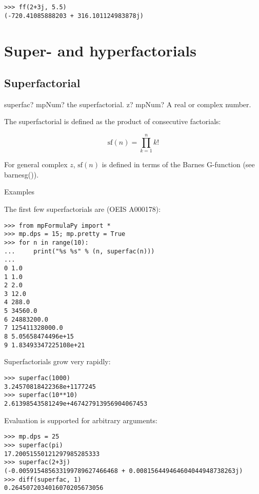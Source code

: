 \begin{lstlisting}
>>> ff(2+3j, 5.5)
(-720.41085888203 + 316.101124983878j)
\end{lstlisting}




\newpage
\section{Super- and hyperfactorials}
\subsection{Superfactorial}

\begin{mpFunctionsExtract}
	\mpFunctionOne
	{superfac? mpNum? the superfactorial.}
	{z? mpNum? A real or complex number.}
\end{mpFunctionsExtract}


The superfactorial is defined as the product of consecutive factorials:

\begin{equation}
\text{sf}(n) = \prod_{k=1}^n k!
\end{equation}

For general complex $z$, $\text{sf}(n)$ is defined in terms of the Barnes G-function (see barnesg()).

Examples 

The first few superfactorials are (OEIS A000178):

\begin{lstlisting}
>>> from mpFormulaPy import *
>>> mp.dps = 15; mp.pretty = True
>>> for n in range(10):
...     print("%s %s" % (n, superfac(n)))
...
0 1.0
1 1.0
2 2.0
3 12.0
4 288.0
5 34560.0
6 24883200.0
7 125411328000.0
8 5.05658474496e+15
9 1.83493347225108e+21
\end{lstlisting}

Superfactorials grow very rapidly:

\begin{lstlisting}
>>> superfac(1000)
3.24570818422368e+1177245
>>> superfac(10**10)
2.61398543581249e+467427913956904067453
\end{lstlisting}

Evaluation is supported for arbitrary arguments:

\begin{lstlisting}
>>> mp.dps = 25
>>> superfac(pi)
17.20051550121297985285333
>>> superfac(2+3j)
(-0.005915485633199789627466468 + 0.008156449464604044948738263j)
>>> diff(superfac, 1)
0.2645072034016070205673056
\end{lstlisting}

